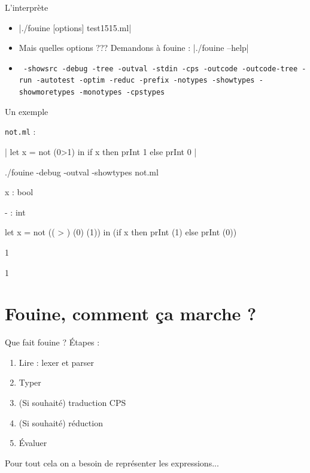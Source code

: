 \documentclass{beamer}
\newcommand{\tocpage}{
  \begin{frame}
    \tableofcontents[currentsection]
  \end{frame}
}
\newcommand{\cmd}[1]{\mint{bash}|#1|}
\begin{document}
\begin{frame}{L'interprète}
  \begin{itemize}

  \item<1-> \cmd{./fouine [options] test1515.ml}

  \item<2->  Mais quelles options ??? Demandons à fouine : \cmd{./fouine --help}

  \item<3->  \texttt{
      -showsrc -debug -tree -outval -stdin -cps -outcode -outcode-tree -run -autotest -optim -reduc -prefix -notypes -showtypes -showmoretypes -monotypes -cpstypes
    }

  \end{itemize}
\end{frame}


\begin{frame}{Un exemple}

   \texttt{not.ml} :

  |
  let x = not (0>1) in if x then prInt 1 else prInt 0
  |

 \begin{tt}
./fouine -debug -outval -showtypes not.ml

x : bool

- : int

let x = not (( > ) (0) (1)) in (if x then prInt (1) else prInt (0))

1

1
\end{tt}

\end{frame}

\section{Fouine, comment ça marche ?}

\tocpage

\begin{frame}{Que fait fouine ?}
  Étapes :
  \begin{enumerate}
  \item Lire : lexer et parser
  \item Typer
  \item (Si souhaité) traduction CPS
  \item (Si souhaité) réduction
  \item Évaluer
  \end{enumerate}

  Pour tout cela on a besoin de représenter les expressions...
\end{frame}
\end{document}
